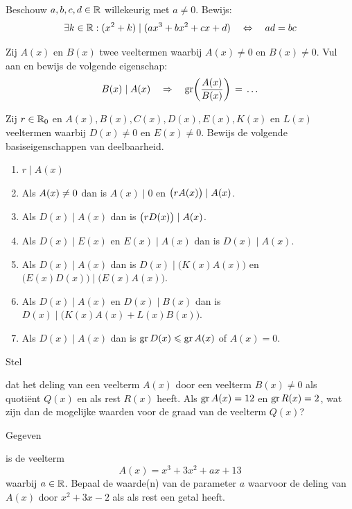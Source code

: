 \documentclass{ximera}
\begin{document}
\begin{exercise} 
Beschouw $a,b,c,d \in \mathbb{R}$ willekeurig met $a \neq 0$. Bewijs:
\[
\exists k \in \mathbb{R}: (x^2 + k) \mid (ax^3 + bx^2 + cx + d) \quad \Leftrightarrow \quad ad = bc
\]
\end{exercise} 

\begin{Uitbreiding}
\begin{exercise} 
Zij $A(x)$ en $B(x)$ twee veeltermen waarbij $A(x) \neq 0$ en $B(x) \neq 0$. Vul aan en bewijs de volgende eigenschap:
\[
B(x) \mid A(x) \quad \Rightarrow \quad \operatorname{gr}\biggl(\frac{A(x)}{B(x)}\biggr) 
\, = \, \ldots
\]
\end{exercise} 

\begin{exercise} 
Zij $r \in \mathbb{R}_0$ en $A(x), B(x), C(x), D(x), E(x), K(x)$ en $L(x)$ veeltermen waarbij $D(x) \neq 0$ en $E(x) \neq 0$. Bewijs de volgende basiseigenschappen van deelbaarheid. 
\begin{enumerate}
\item
$r \mid A(x)$
\item
Als $\displaystyle A(x)  \neq 0$ dan is $A(x) \mid 0$ en $\displaystyle \bigl(rA(x)\bigr) \mid A(x)$.
\item
Als $D(x) \mid A(x)$ dan is $\displaystyle \bigl(rD(x)\bigr) \mid A(x)$.
\item
Als $D(x) \mid E(x)$ en $E(x) \mid A(x)$ dan is $D(x) \mid A(x)$. 
\item
Als $D(x) \mid A(x)$ dan is $D(x) \mid \bigl(K(x)A(x)\bigr)$ en $\bigl(E(x)D(x)\bigr) \mid \bigl(E(x)A(x)\bigr)$.
\item
Als $D(x) \mid A(x)$ en $D(x) \mid B(x)$ dan is $D(x) \mid \bigl(K(x)A(x)+L(x)B(x)\bigr)$.
\item
Als $D(x) \mid A(x)$ dan is $\operatorname{gr} D(x) \leqslant \operatorname{gr} A(x)$ of $A(x) = 0$.
\end{enumerate}
\end{exercise} 
\end{Uitbreiding}

\begin{exercise} 
\hypertarget{oef2.17}{Stel} dat het deling van een veelterm $A(x)$ door een veelterm $B(x) \neq 0$ als quoti\"ent $Q(x)$ en als rest $R(x)$ heeft. Als $\operatorname{gr} A(x) = 12$ en $\operatorname{gr} R(x) = 2$, wat zijn dan de mogelijke waarden voor de graad van de veelterm $Q(x)$?
\end{exercise} 

\begin{exercise} 
\hypertarget{oef2.18}{Gegeven} is de veelterm
\[
A(x) = x^3+3x^2+ax+13
\]
waarbij $a \in \mathbb{R}$. Bepaal de waarde(n) van de parameter $a$ waarvoor de deling van $A(x)$ door $x^2+3x-2$ als als rest een getal heeft. 
\end{exercise} 
\end{document}
